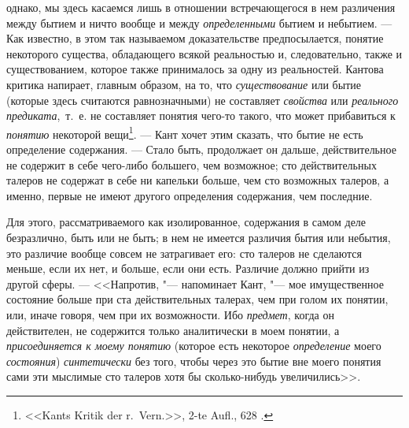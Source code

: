 однако, мы здесь касаемся лишь в отношении встречающегося в нем различения
между бытием и ничто вообще и между {\em определенными}
бытием и небытием. --- Как известно, в этом так называемом доказательстве
предпосылается, понятие некоторого существа, обладающего всякой реальностью
и, следовательно, также и существованием, которое также принималось за одну
из реальностей. Кантова критика напирает, главным образом, на то, что
{\em существование} или бытие (которые здесь считаются
равнозначными) не составляет {\em свойства} или
{\em реального предиката},~т.~е. не составляет понятия
чего-то такого, что может прибавиться к {\em понятию}
некоторой вещи\footnote{ <<Kants Kritik der r.~Vern.>>, 2-te Aufl., 628
.}.
--- Кант хочет этим сказать, что бытие не
есть определение содержания. --- Стало быть, продолжает он дальше,
действительное не содержит в себе чего-либо большего, чем возможное; сто
действительных талеров не содержат в себе ни капельки больше, чем сто
возможных талеров, а именно, первые не имеют другого определения
содержания, чем последние.

Для этого, рассматриваемого как изолированное, содержания в самом деле
безразлично, быть или не быть; в нем не имеется различия бытия или небытия,
это различие вообще совсем не затрагивает его: сто талеров не сделаются
меньше, если их нет, и больше, если они есть. Различие должно прийти из
другой сферы. --- <<Напротив, "--- напоминает Кант, "--- мое имущественное состояние
больше при ста действительных талерах, чем при голом их понятии, или, иначе
говоря, чем при их возможности. Ибо {\em предмет},
когда он действителен, не содержится только аналитически в моем понятии, а
{\em присоединяется к моему понятию} (которое есть
некоторое {\em определение} моего
{\em состояния}) {\em синтетически}
без того, чтобы через это бытие вне моего понятия сами эти мыслимые сто
талеров хотя бы сколько-нибудь увеличились>>.

